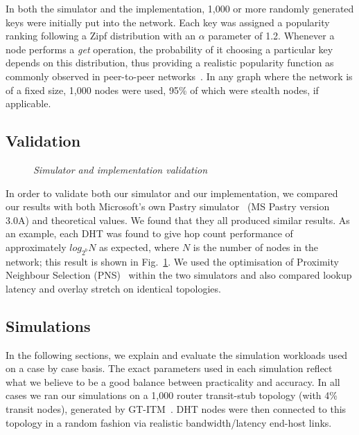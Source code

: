 \documentclass[letterpaper]{sig-alternate} %
\begin{document}
In both the simulator and the implementation, 1,000 or more randomly generated
keys were initially put into the network. Each key was assigned a popularity
ranking following a Zipf distribution with an $\alpha$ parameter of 1.2.
Whenever a node performs a \emph{get} operation, the probability of it choosing
a particular key depends on this distribution, thus providing a realistic
popularity function as commonly observed in peer-to-peer networks~\cite{zipf}.
In any graph where the network is of a fixed size, 1,000 nodes were used, 95\%
of which were stealth nodes, if applicable.

\subsection{Validation}
\label{subsect-valid}

\begin{figure}[tb]
\centering {}
\caption{\em Simulator and implementation validation} \label{fig:validation}
\end{figure}

In order to validate both our simulator and our implementation, we compared our
results with both Microsoft's own Pastry simulator~\cite{rowstron01pastry} (MS
Pastry version 3.0A) and theoretical values. We found that they all produced
similar results. As an example, each DHT was found to give hop count
performance of approximately $log_{2^b}N$ as expected, where $N$ is the number
of nodes in the network; this result is shown in Fig.~\ref{fig:validation}. We
used the optimisation of Proximity Neighbour Selection
(PNS)~\cite{rowstron01pastry} within the two simulators and also compared
lookup latency and overlay stretch on identical topologies.

\subsection{Simulations}

In the following sections, we explain and evaluate the simulation
workloads used on a case by case basis. The exact parameters used in
each simulation reflect what we believe to be a good balance between
practicality and accuracy. In all cases we ran our simulations on a
1,000 router transit-stub topology (with 4\% transit nodes), generated
by GT-ITM~\cite{gtitm}. DHT nodes were then connected to this topology
in a random fashion via realistic bandwidth/latency end-host links.
\end{document}
